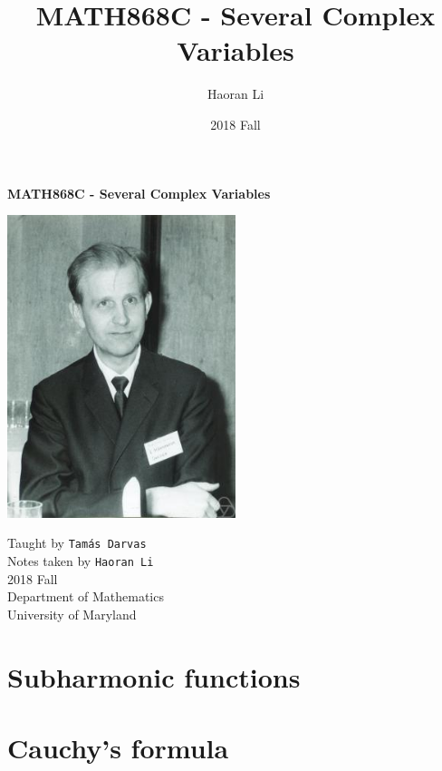 \documentclass[a4paper,10pt]{article}
\title{MATH868C - Several Complex Variables}
\author{Haoran Li}
\date{2018 Fall}
\begin{document}
\sloppy %

\begin{titlepage}
\begin{center}
\vspace*{1cm}
\LARGE
\textbf{MATH868C - Several Complex Variables} \\
\vspace{2cm}
\begin{center}
\includegraphics[width=0.5\textwidth]{Pictures/Lars_Hormander.jpg}
\end{center}
\vspace{2cm}
\normalsize
Taught by \texttt{Tam\'as Darvas} \\
Notes taken by \texttt{Haoran Li} \\
2018 Fall \\
\vspace{2cm}
Department of Mathematics\\
University of Maryland\\
\end{center}
\end{titlepage}

\tableofcontents
\newpage

\section{Subharmonic functions}

\newpage

\section{Cauchy's formula}

\newpage
\end{document}
